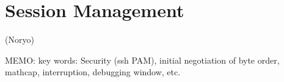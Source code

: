 
\section{Session Management}  (Noryo)

MEMO: key words:
Security (ssh PAM), initial negotiation of byte order,
mathcap, interruption, debugging window, etc.
 